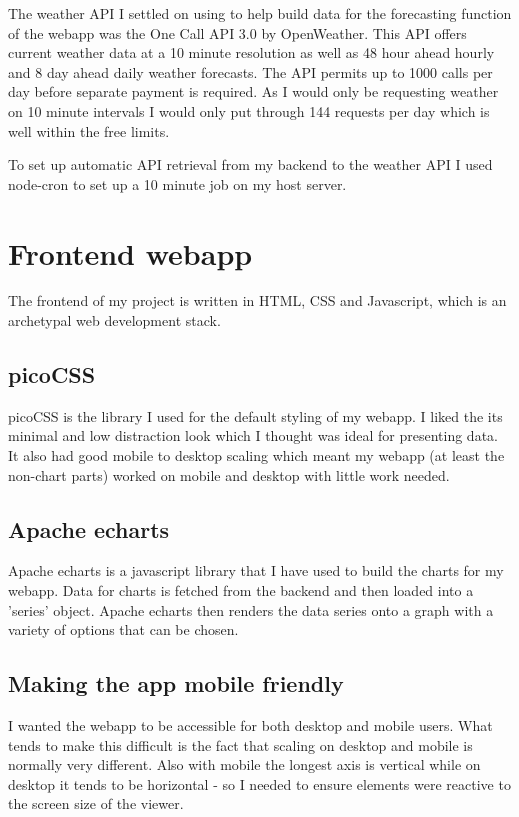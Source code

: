 The weather API I settled on using to help build data for the forecasting
function of the webapp was the One Call API 3.0 by OpenWeather. This API offers
current weather data at a 10 minute resolution as well as 48 hour ahead hourly
and 8 day ahead daily weather forecasts. The API permits up to 1000 calls per
day before separate payment is required. As I would only be requesting weather
on 10 minute intervals I would only put through 144 requests per day which is
well within the free limits.

To set up automatic API retrieval from my backend to the weather API I used
node-cron to set up a 10 minute job on my host server.

\section{Frontend webapp}

The frontend of my project is written in HTML, CSS and Javascript, which is an
archetypal web development stack.

\subsection{picoCSS}

picoCSS is the library I used for the default styling of my webapp. I liked the
its minimal and low distraction look which I thought was ideal for presenting
data. It also had good mobile to desktop scaling which meant my webapp (at least
the non-chart parts) worked on mobile and desktop with little work needed.

\subsection{Apache echarts}

Apache echarts is a javascript library that I have used to build the charts for
my webapp. Data for charts is fetched from the backend and then loaded into a
'series' object. Apache echarts then renders the data series onto a graph with a
variety of options that can be chosen.


\subsection{Making the app mobile friendly}

I wanted the webapp to be accessible for both desktop and mobile users. What
tends to make this difficult is the fact that scaling on desktop and mobile is
normally very different. Also with mobile the longest axis is vertical while on
desktop it tends to be horizontal - so I needed to ensure elements were reactive
to the screen size of the viewer.

